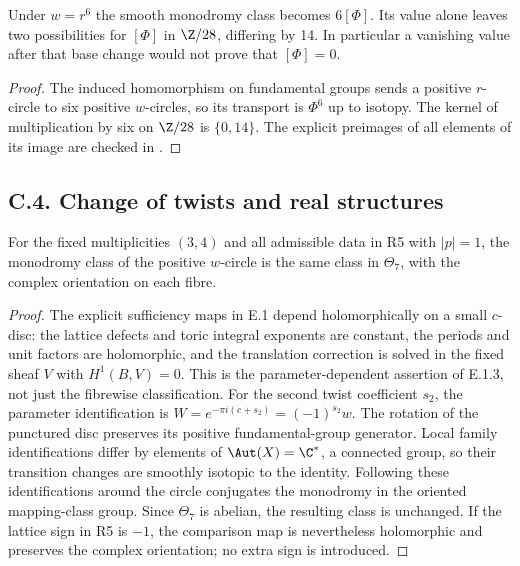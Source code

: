 \begin{proposition}
Under $w=r^6$ the smooth monodromy class becomes $6[\Phi]$.
Its value alone leaves two possibilities for $[\Phi]$ in $\Z/28$,
differing by 14. In particular a vanishing value after that base
change would not prove that $[\Phi]=0$.
\end{proposition}
\begin{proof}
The induced homomorphism on fundamental groups sends a positive
$r$-circle to six positive $w$-circles, so its transport is
$\Phi^6$ up to isotopy. The kernel of multiplication by six on
$\Z/28$ is $\{0,14\}$. The explicit preimages of all elements
of its image are checked in .
\end{proof}












\subsection{C.4. Change of twists and real structures}

\begin{proposition}
For the fixed multiplicities $(3,4)$ and all admissible data in R5
with $|p|=1$, the monodromy class of the positive $w$-circle is the
same class in $\Theta_7$, with the complex orientation on each fibre.
\end{proposition}

\begin{proof}
The explicit sufficiency maps in E.1 depend holomorphically on a
small $c$-disc: the lattice defects and toric integral exponents are
constant, the periods and unit factors are holomorphic, and the
translation correction is solved in the fixed sheaf $V$ with
$H^1(B,V)=0$. This is the parameter-dependent assertion of E.1.3,
not just the fibrewise classification. For the second twist
coefficient $s_2$, the parameter identification is
$W=e^{-\pi i(c+s_2)}=(-1)^{s_2}w$.
The rotation of the punctured disc preserves its positive
fundamental-group generator. Local family identifications differ
by elements of $\Aut(X)=\C^*$, a connected group, so their
transition changes are smoothly isotopic to the identity. Following
these identifications around the circle conjugates the monodromy
in the oriented mapping-class group. Since $\Theta_7$ is abelian,
the resulting class is unchanged. If the lattice sign in R5 is
$-1$, the comparison map is nevertheless holomorphic and preserves
the complex orientation; no extra sign is introduced.
\end{proof}

